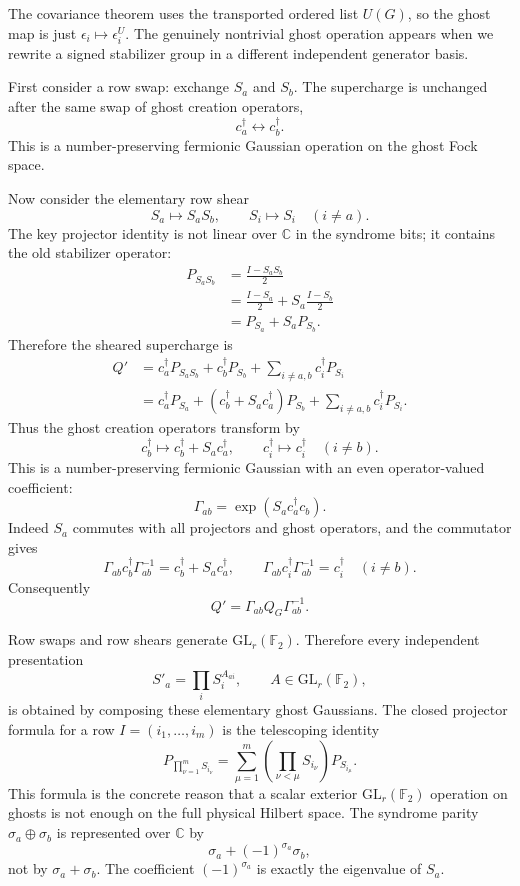 The covariance theorem uses the transported ordered list \(U(G)\), so the ghost
map is just \(\epsilon_i\mapsto\epsilon_i^U\).  The genuinely nontrivial ghost
operation appears when we rewrite a signed stabilizer group in a different
independent generator basis.

First consider a row swap: exchange \(S_a\) and \(S_b\).  The supercharge is
unchanged after the same swap of ghost creation operators,
\[
  c_a^\dagger\leftrightarrow c_b^\dagger .
\]
This is a number-preserving fermionic Gaussian operation on the ghost Fock
space.

Now consider the elementary row shear
\[
  S_a\longmapsto S_aS_b,\qquad S_i\longmapsto S_i\quad(i\ne a).
\]
The key projector identity is not linear over \(\mathbb C\) in the syndrome
bits; it contains the old stabilizer operator:
\[
\begin{aligned}
  P_{S_aS_b}
  &=
  \frac{I-S_aS_b}{2}                                      \\
  &=
  \frac{I-S_a}{2}+S_a\frac{I-S_b}{2}                       \\
  &=
  P_{S_a}+S_aP_{S_b}.
\end{aligned}
\]
Therefore the sheared supercharge is
\[
\begin{aligned}
  Q'
  &=
  c_a^\dagger P_{S_aS_b}
  +c_b^\dagger P_{S_b}
  +\sum_{i\ne a,b}c_i^\dagger P_{S_i}                       \\
  &=
  c_a^\dagger P_{S_a}
  +(c_b^\dagger+S_ac_a^\dagger)P_{S_b}
  +\sum_{i\ne a,b}c_i^\dagger P_{S_i}.
\end{aligned}
\]
Thus the ghost creation operators transform by
\[
  c_b^\dagger\longmapsto c_b^\dagger+S_ac_a^\dagger,
  \qquad c_i^\dagger\longmapsto c_i^\dagger\quad(i\ne b).
\]
This is a number-preserving fermionic Gaussian with an even
operator-valued coefficient:
\[
  \Gamma_{ab}=\exp(S_a c_a^\dagger c_b).
\]
Indeed \(S_a\) commutes with all projectors and ghost operators, and the
commutator gives
\[
  \Gamma_{ab}c_b^\dagger\Gamma_{ab}^{-1}
  =
  c_b^\dagger+S_ac_a^\dagger,
  \qquad
  \Gamma_{ab}c_i^\dagger\Gamma_{ab}^{-1}=c_i^\dagger
  \quad(i\ne b).
\]
Consequently
\[
  Q'=\Gamma_{ab}Q_G\Gamma_{ab}^{-1}.
\]

Row swaps and row shears generate \(\mathrm{GL}_r(\mathbb F_2)\).  Therefore
every independent presentation
\[
  S'_a=\prod_i S_i^{A_{ai}},\qquad A\in\mathrm{GL}_r(\mathbb F_2),
\]
is obtained by composing these elementary ghost Gaussians.  The closed
projector formula for a row \(I=(i_1,\ldots,i_m)\) is the telescoping identity
\[
  P_{\prod_{\nu=1}^mS_{i_\nu}}
  =
  \sum_{\mu=1}^m
  \left(\prod_{\nu<\mu}S_{i_\nu}\right)P_{S_{i_\mu}} .
\]
This formula is the concrete reason that a scalar exterior
\(\mathrm{GL}_r(\mathbb F_2)\) operation on ghosts is not enough on the full
physical Hilbert space.  The syndrome parity
\(\sigma_a\oplus\sigma_b\) is represented over \(\mathbb C\) by
\[
  \sigma_a+(-1)^{\sigma_a}\sigma_b,
\]
not by \(\sigma_a+\sigma_b\).  The coefficient \((-1)^{\sigma_a}\) is exactly
the eigenvalue of \(S_a\).

